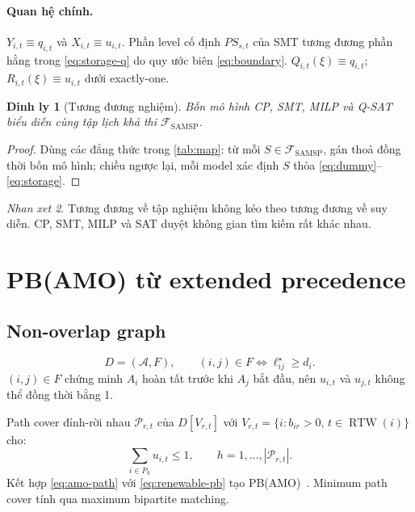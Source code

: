 \documentclass[11pt,a4paper]{article}
\newtheorem{theorem}{Dinh ly}[section]
\theoremstyle{remark}
\newtheorem{remark}[theorem]{Nhan xet}
\newcommand{\RTW}{\operatorname{RTW}}
\begin{document}
\paragraph{Quan hệ chính.}
$Y_{i,t} \equiv q_{i,t}$ và $X_{i,t} \equiv u_{i,t}$.
Phần level cố định $PS_{s,t}$ của SMT tương đương phần hằng trong
\eqref{eq:storage-q} do quy ước biên \eqref{eq:boundary}.
$Q_{i,t}(\xi) \equiv q_{i,t}$; $R_{i,t}(\xi) \equiv u_{i,t}$ dưới exactly-one.

\begin{theorem}[Tương đương nghiệm]
\label{thm:equiv}
Bốn mô hình CP, SMT, MILP và Q-SAT biểu diễn cùng tập lịch khả thi
$\mathcal{F}_\mathrm{SAMSP}$.
\end{theorem}

\begin{proof}
Dùng các đẳng thức trong \cref{tab:map}: từ mỗi $S \in \mathcal{F}_\mathrm{SAMSP}$,
gán thoả đồng thời bốn mô hình; chiều ngược lại, mỗi model xác định $S$
thỏa \eqref{eq:dummy}--\eqref{eq:storage}.
\end{proof}

\begin{remark}
Tương đương về tập nghiệm không kéo theo tương đương về suy diễn.
CP, SMT, MILP và SAT duyệt không gian tìm kiếm rất khác nhau.
\end{remark}

\section{PB(AMO) từ extended precedence}
\label{sec:pbamo}

\subsection{Non-overlap graph}

\begin{equation}
  D = (\mathcal{A}, F),\qquad (i,j) \in F \iff \ell^\star_{ij} \ge d_i.
  \label{eq:nooverlap}
\end{equation}
$(i,j) \in F$ chứng minh $A_i$ hoàn tất trước khi $A_j$ bắt đầu, nên
$u_{i,t}$ và $u_{j,t}$ không thể đồng thời bằng 1.

Path cover đỉnh-rời nhau $\mathcal{P}_{r,t}$ của $D[V_{r,t}]$
với $V_{r,t} = \{i : b_{ir} > 0,\, t \in \RTW(i)\}$ cho:
\begin{equation}
  \sum_{i \in P_h} u_{i,t} \le 1, \qquad h = 1, \ldots, |\mathcal{P}_{r,t}|.
  \label{eq:amo-path}
\end{equation}
Kết hợp \eqref{eq:amo-path} với \eqref{eq:renewable-pb} tạo PB(AMO)~\cite{bofill2021pbamo}.
Minimum path cover tính qua maximum bipartite matching.
\end{document}
